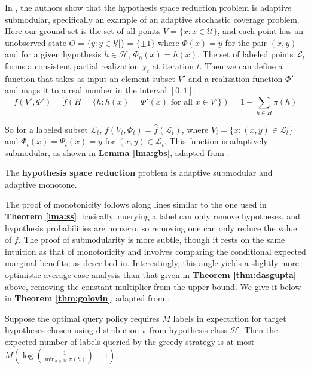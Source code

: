 In \cite{Golovin}, the authors show that the hypothesis space reduction problem is adaptive submodular, specifically an example of an adaptive stochastic coverage problem. Here our ground set is the set of all points $V = \{x : x \in \mathcal{U}\}$, and each point has an unobserved state $O = \{y : y \in \mathcal{Y}|\} = \{\pm1\}$ where $\Phi(x) = y$ for the pair $(x,y)$ and for a given hypothesis $h \in \mathcal{H}$, $\Phi_h(x) = h(x)$. The set of labeled points $\mathcal{L}_t$ forms a consistent partial realization $\chi_t$ at iteration $t$. Then we can define a function that takes as input an element subset $V'$ and a realization function $\Phi'$ and maps it to a real number in the interval $[0,1]$:
\[
f(V', \Phi') = \hat{f}(H = \{h : h(x) = \Phi'(x) \mbox{ for all } x \in V'\}) = 1 - \sum_{h \in H} \pi(h)
\]

\noindent So for a labeled subset $\mathcal{L}_t$, $f(V_t, \Phi_t) = \hat{f}(\mathcal{L}_t)$, where $V_t = \{ x : (x,y) \in \mathcal{L}_t \}$ and $\Phi_t(x) = \Psi_t(x) = y$ for $(x, y) \in \mathcal{L}_t$. This function is adaptively submodular, as shown in \textbf{Lemma \ref{lma:gbs}}, adapted from \cite{Golovin}:\\

\begin{lemma}
\label{lma:gbs}
The \textbf{hypothesis space reduction} problem is adaptive submodular and adaptive monotone.
\end{lemma}

\noindent The proof of monotonicity follows along lines similar to the one used in \textbf{Theorem \ref{lma:ss}}: basically, querying a label can only remove hypotheses, and hypothesis probabilities are nonzero, so removing one can only reduce the value of $f$. The proof of submodularity is more subtle, though it rests on the same intuition as that of monotonicity and involves comparing the conditional expected marginal benefits, as described in. Interestingly, this angle yields a slightly more optimistic average case analysis than that given in \textbf{Theorem \ref{thm:dasgupta}} above, removing the constant multiplier from the upper bound. We give it below in \textbf{Theorem \ref{thm:golovin}}, adapted from \cite{Golovin}:\\

\begin{theorem}
\label{thm:golovin}
Suppose the optimal query policy requires $M$ labels in expectation for target hypotheses chosen using distribution $\pi$ from hypothesis class $\mathcal{H}$. Then the expected number of labels queried by the greedy strategy is at most $M \left(\log \left(\frac{1}{\min_{h \in \mathcal{H}} \pi(h)}\right) + 1\right)$.
\end{theorem}

